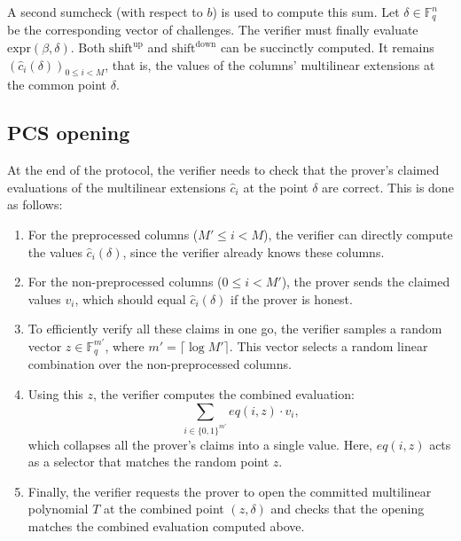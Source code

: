 \documentclass{article}
\newcommand{\Fq}{\mathbb F_q}
\newcommand{\Pol}{T}
\begin{document}
A second sumcheck (with respect to $b$) is used to compute this sum. Let $\delta \in \Fq^n$ be the corresponding vector of challenges. The verifier must finally evaluate $\text{expr}(\beta, \delta)$. Both $\text{shift}^{\text{up}}$ and $\text{shift}^{\text{down}}$ can be succinctly computed. It remains $(\widehat{c}_i(\delta))_{0 \leq i < M}$, that is, the values of the columns’ multilinear extensions at the common point $\delta$.

\subsection{PCS opening}

At the end of the protocol, the verifier needs to check that the prover’s claimed evaluations of the multilinear extensions $\widehat{c}_i$ at the point $\delta$ are correct. This is done as follows:

\begin{enumerate}
\item For the preprocessed columns ($M' \leq i < M$), the verifier can directly compute the values $\widehat{c}_i(\delta)$, since the verifier already knows these columns.

\item For the non-preprocessed columns ($0 \leq i < M'$), the prover sends the claimed values $v_i$, which should equal $\widehat{c}_i(\delta)$ if the prover is honest.

\item To efficiently verify all these claims in one go, the verifier samples a random vector $z \in \Fq^{m'}$, where $m' = \lceil \log M' \rceil$. This vector selects a random linear combination over the non-preprocessed columns. 


\item Using this $z$, the verifier computes the combined evaluation:
$$
\sum_{i \in \{0, 1\}^{m'}} eq(i, z) \cdot v_i,
$$
which collapses all the prover’s claims into a single value. Here, $eq(i, z)$ acts as a selector that matches the random point $z$.


\item Finally, the verifier requests the prover to open the committed multilinear polynomial $\Pol$ at the combined point $(z, \delta)$ and checks that the opening matches the combined evaluation computed above.
\end{enumerate}
\end{document}
